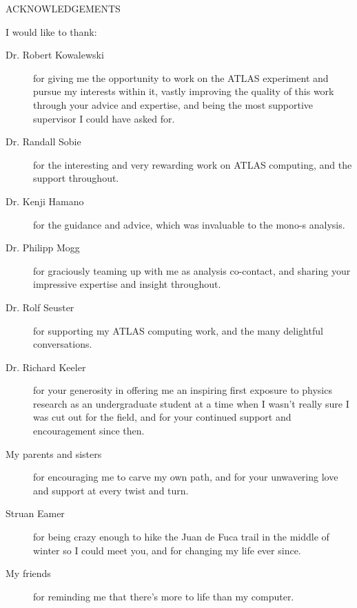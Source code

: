 \newpage

\begin{center}
ACKNOWLEDGEMENTS
\end{center}


\noindent 
I would like to thank:

\begin{description}
\item[Dr. Robert Kowalewski]
	for giving me the opportunity to work on the ATLAS experiment and pursue my interests within it, vastly improving the quality of this work through your advice and expertise, and being the most supportive supervisor I could have asked for. 
\item[Dr. Randall Sobie]
	for the interesting and very rewarding work on ATLAS computing, and the support throughout. 
\item[Dr. Kenji Hamano]
         for the guidance and advice, which was invaluable to the mono-s analysis.
\item[Dr. Philipp Mogg]
	for graciously teaming up with me as analysis co-contact, and sharing your impressive expertise and insight throughout. 
\item[Dr. Rolf Seuster]
	for supporting my ATLAS computing work, and the many delightful conversations. 
\item[Dr. Richard Keeler]
	for your generosity in offering me an inspiring first exposure to physics research as an undergraduate student at a time when I wasn't really sure I was cut out for the field, and for your continued support and encouragement since then. 
\item[My parents and sisters]
	for encouraging me to carve my own path, and for your unwavering love and support at every twist and turn. 
\item[Struan Eamer]
	for being crazy enough to hike the Juan de Fuca trail in the middle of winter so I could meet you, and for changing my life ever since. 
\item[My friends]
	for reminding me that there's more to life than my computer. 
\end{description}
